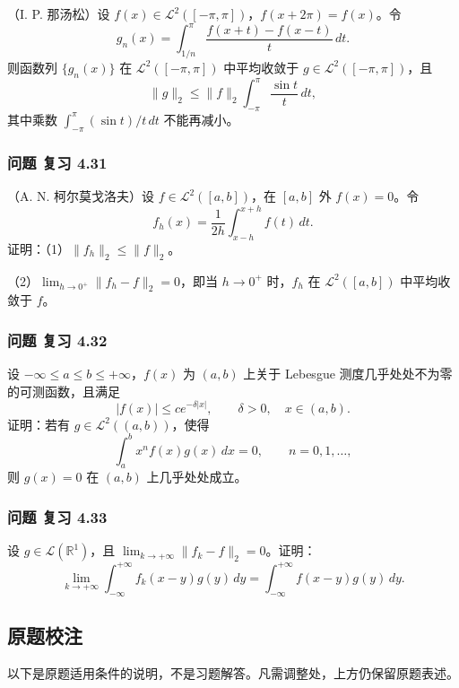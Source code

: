 \documentclass[11pt,a4paper]{article}
\begin{document}
（I. P. 那汤松）设
\(f(x)\in\mathcal L^2([-\pi,\pi])\)，\(f(x+2\pi)=f(x)\)。令 \[
g_n(x)=\int_{1/n}^\pi\frac{f(x+t)-f(x-t)}{t}\,dt.
\] 则函数列 \(\{g_n(x)\}\) 在 \(\mathcal L^2([-\pi,\pi])\) 中平均收敛于
\(g\in\mathcal L^2([-\pi,\pi])\)，且 \[
\|g\|_2\le\|f\|_2\int_{-\pi}^{\pi}\frac{\sin t}{t}\,dt,
\] 其中乘数 \(\int_{-\pi}^{\pi}(\sin t)/t\,dt\) 不能再减小。

\subsubsection{问题 复习 4.31}\label{ch04-practice-ux95eeux9898-ux590dux4e60-4.31}

（A. N. 柯尔莫戈洛夫）设 \(f\in\mathcal L^2([a,b])\)，在 \([a,b]\) 外
\(f(x)=0\)。令 \[
f_h(x)=\frac1{2h}\int_{x-h}^{x+h}f(t)\,dt.
\] 证明：（1）\(\|f_h\|_2\le\|f\|_2\)。

（2）\(\lim_{h\to0^+}\|f_h-f\|_2=0\)，即当 \(h\to0^+\) 时，\(f_h\) 在
\(\mathcal L^2([a,b])\) 中平均收敛于 \(f\)。

\subsubsection{问题 复习 4.32}\label{ch04-practice-ux95eeux9898-ux590dux4e60-4.32}

设 \(-\infty\le a\le b\le+\infty\)，\(f(x)\) 为 \((a,b)\) 上关于
Lebesgue 测度几乎处处不为零的可测函数，且满足 \[
|f(x)|\le ce^{-\delta|x|},\qquad\delta>0,\quad x\in(a,b).
\] 证明：若有 \(g\in\mathcal L^2((a,b))\)，使得 \[
\int_a^bx^nf(x)g(x)\,dx=0,\qquad n=0,1,\ldots,
\] 则 \(g(x)=0\) 在 \((a,b)\) 上几乎处处成立。

\subsubsection{问题 复习 4.33}\label{ch04-practice-ux95eeux9898-ux590dux4e60-4.33}

设 \(g\in\mathcal L(\mathbb R^1)\)，且
\(\lim_{k\to+\infty}\|f_k-f\|_2=0\)。证明： \[
\lim_{k\to+\infty}\int_{-\infty}^{+\infty}f_k(x-y)g(y)\,dy
=\int_{-\infty}^{+\infty}f(x-y)g(y)\,dy.
\]

\subsection{原题校注}\label{ch04-practice-ux539fux9898ux6821ux6ce8}

以下是原题适用条件的说明，不是习题解答。凡需调整处，上方仍保留原题表述。
\end{document}
